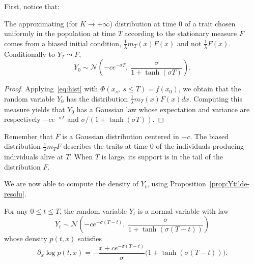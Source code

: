 \documentclass[AHL,Unicode,longabstracts,published]{cedram}
\renewcommand{\No}{\mathcal{N}}
\begin{document}

First, notice that:

\begin{prop}
The approximating {(for $K\rightarrow +\infty$)} distribution at time $0$ of a trait chosen uniformly in the population at time $T$ according to the stationary measure $F$ comes from a biased initial condition, $\frac{1}{\lambda}m_T(x)F(x)$ and not $\frac{1}{\lambda}F(x)$. Conditionally to $Y_T\leadsto F$,
\begin{equation}\label{Y0}
Y_{0}\sim \No\left(- c e^{-\sigma T},\ \frac{\sigma}{1+\tanh(\sigma T)}\right).
\end{equation}
\end{prop}

\begin{proof}
Applying~\eqref{eq:hist} with $\Phi(x_{s},\ s\leq T) = f(x_{0})$, we obtain that the random variable $Y_{0}$ has the distribution $\frac{1}{\lambda}m_T(x)F(x)dx$. Computing this measure yields that $Y_{0}$ has a Gaussian law whose expectation and variance are respectively $-ce^{-\sigma T}$ and $\sigma/(1+\tanh(\sigma T))$.
\end{proof}


Remember that $F$ is a Gaussian distribution centered in $-c$. The biased distribution $\frac{1}{\lambda} m_{T}F$ describes the traits at time $0$ of the individuals producing individuals alive at $T$. When $T$ is large, its support is in the tail of the distribution $F$.





We are now able to compute the density of $Y_{t}$, using Proposition~\ref{prop:Ytilde-resolu}.

\begin{prop}
For any $0\leq t\leq T$, the random variable $Y_{t}$ is a normal variable with law
\[
Y_{t}\sim \No\left(-ce^{-\sigma (T-t)},\ \frac{\sigma}{1+\tanh(\sigma(T-t))}\right)
\]
whose density $p(t,x)$ satisfies
\[
\partial_{x}\log p(t,x)=-\frac{x+ce^{-\sigma(T-t)}}{\sigma}\big(1+\tanh(\sigma(T-t)) \big).
\]
\end{prop}

\end{document}
